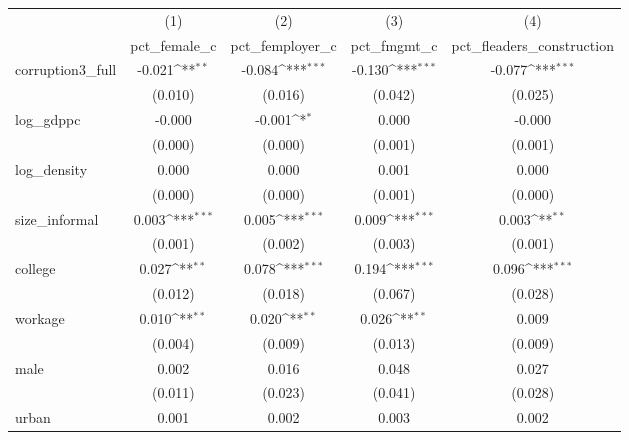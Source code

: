 {
\def\sym#1{\ifmmode^{#1}\else\(^{#1}\)\fi}
\begin{tabular}{l*{4}{c}}
\hline\hline
            &\multicolumn{1}{c}{(1)}&\multicolumn{1}{c}{(2)}&\multicolumn{1}{c}{(3)}&\multicolumn{1}{c}{(4)}\\
            &\multicolumn{1}{c}{pct\_female\_c}&\multicolumn{1}{c}{pct\_femployer\_c}&\multicolumn{1}{c}{pct\_fmgmt\_c}&\multicolumn{1}{c}{pct\_fleaders\_construction}\\
\hline
corruption3\_full&      -0.021\sym{**} &      -0.084\sym{***}&      -0.130\sym{***}&      -0.077\sym{***}\\
            &     (0.010)         &     (0.016)         &     (0.042)         &     (0.025)         \\
[1em]
log\_gdppc   &      -0.000         &      -0.001\sym{*}  &       0.000         &      -0.000         \\
            &     (0.000)         &     (0.000)         &     (0.001)         &     (0.001)         \\
[1em]
log\_density &       0.000         &       0.000         &       0.001         &       0.000         \\
            &     (0.000)         &     (0.000)         &     (0.001)         &     (0.000)         \\
[1em]
size\_informal&       0.003\sym{***}&       0.005\sym{***}&       0.009\sym{***}&       0.003\sym{**} \\
            &     (0.001)         &     (0.002)         &     (0.003)         &     (0.001)         \\
[1em]
college     &       0.027\sym{**} &       0.078\sym{***}&       0.194\sym{***}&       0.096\sym{***}\\
            &     (0.012)         &     (0.018)         &     (0.067)         &     (0.028)         \\
[1em]
workage     &       0.010\sym{**} &       0.020\sym{**} &       0.026\sym{**} &       0.009         \\
            &     (0.004)         &     (0.009)         &     (0.013)         &     (0.009)         \\
[1em]
male        &       0.002         &       0.016         &       0.048         &       0.027         \\
            &     (0.011)         &     (0.023)         &     (0.041)         &     (0.028)         \\
[1em]
urban       &       0.001         &       0.002         &       0.003         &       0.002         \\

\end{tabular}}
